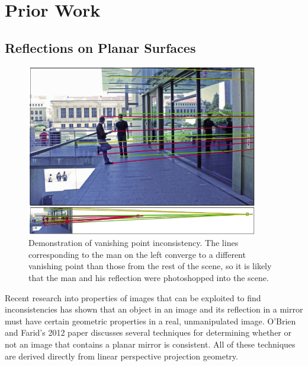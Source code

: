 \documentclass{article}
\begin{document}

\pagestyle{plain}





\section{Prior Work}
\subsection{Reflections on Planar Surfaces}
\begin{figure}[h!]
	\centering
    	\includegraphics[width=0.9\textwidth]{planar-vanishing-point-forged}
	\caption{Demonstration of vanishing point inconsistency. The lines corresponding to the man on the left converge to a different vanishing point than those from the rest of the scene, so it is likely that the man and his reflection were photoshopped into the scene.}
	\label{planar-vanishing-point-forged}
\end{figure}
Recent research into properties of images that can be exploited to find inconsistencies has shown that an object in an image and its reflection in a mirror must have certain geometric properties in a real, unmanipulated image. O'Brien and Farid's 2012 paper discusses several techniques for determining whether or not an image that contains a planar mirror is consistent. All of these techniques are derived directly from linear perspective projection geometry. \\
\end{document}
